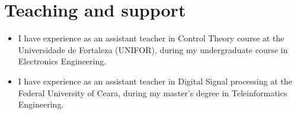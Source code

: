 \section{Teaching and support}
\begin{itemize}[leftmargin=0.15in, label={}] %
    \item I have experience as an assistant teacher in Control Theory course at the Universidade de Fortaleza (UNIFOR), during my undergraduate course in Electronics Engineering.
    \item I have experience as an assistant teacher in Digital Signal processing at the Federal University of Ceara, during my master's degree in Teleinformatics Engineering. 
\end{itemize}
